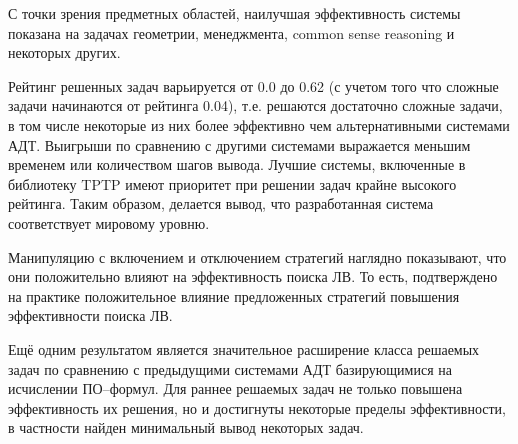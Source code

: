 С точки зрения предметных областей, наилучшая эффективность системы показана на задачах геометрии, менеджмента, common sense reasoning и некоторых других.

Рейтинг решенных задач варьируется от 0.0 до 0.62 (с учетом того что сложные задачи начинаются от рейтинга 0.04), т.е. решаются достаточно сложные задачи, в том числе некоторые из них более эффективно чем альтернативными системами АДТ. Выигрыши по сравнению с другими системами выражается меньшим временем или количеством шагов вывода. Лучшие системы, включенные в библиотеку TPTP имеют приоритет при решении задач крайне высокого рейтинга. Таким образом, делается вывод, что разработанная система соответствует мировому уровню.

Манипуляцию с включением и отключением стратегий наглядно показывают, что они положительно влияют на эффективность поиска ЛВ. То есть, подтверждено на практике положительное влияние предложенных стратегий повышения эффективности поиска ЛВ.

Ещё одним результатом является значительное расширение класса решаемых задач по сравнению с предыдущими системами АДТ базирующимися на исчислении ПО--формул. Для раннее решаемых задач не только повышена эффективность их решения, но и достигнуты некоторые пределы эффективности, в частности найден минимальный вывод некоторых задач.







